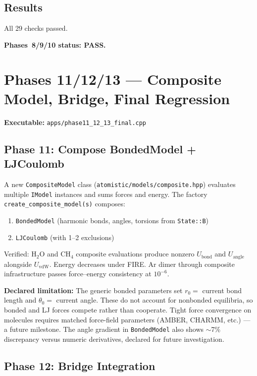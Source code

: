 \documentclass[11pt]{article}
\begin{document}
\subsection{Results}

All 29 checks passed.

\textbf{Phases~8/9/10 status: PASS.}

\section{Phases 11/12/13 --- Composite Model, Bridge, Final Regression}

\textbf{Executable:} \texttt{apps/phase11\_12\_13\_final.cpp}

\subsection{Phase 11: Compose BondedModel + LJCoulomb}

A new \texttt{CompositeModel} class (\texttt{atomistic/models/composite.hpp})
evaluates multiple \texttt{IModel} instances and sums forces and energy.
The factory \texttt{create\_composite\_model(s)} composes:
\begin{enumerate}
\item \texttt{BondedModel} (harmonic bonds, angles, torsions from \texttt{State::B})
\item \texttt{LJCoulomb} (with 1--2 exclusions)
\end{enumerate}

Verified: H$_2$O and CH$_4$ composite evaluations produce nonzero
$U_{\mathrm{bond}}$ and $U_{\mathrm{angle}}$ alongside $U_{\mathrm{vdW}}$.
Energy decreases under FIRE. Ar dimer through composite infrastructure passes
force--energy consistency at $10^{-6}$.

\textbf{Declared limitation:} The generic bonded parameters set
$r_0 = $ current bond length and $\theta_0 = $ current angle.  These do not
account for nonbonded equilibria, so bonded and LJ forces compete rather
than cooperate.  Tight force convergence on molecules requires matched
force-field parameters (AMBER, CHARMM, etc.) --- a future milestone.
The angle gradient in \texttt{BondedModel} also shows $\sim$7\% discrepancy
versus numeric derivatives, declared for future investigation.

\subsection{Phase 12: Bridge Integration}
\end{document}
